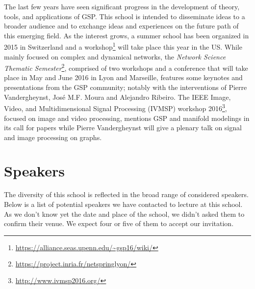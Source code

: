 \documentclass[a4paper]{scrartcl}
\begin{document}
The last few years have seen significant progress in the development of theory,
tools, and applications of GSP. This school is intended to disseminate ideas to
a broader audience and to exchange ideas and experiences on the future path of
this emerging field.
As the interest grows, a summer school has been organized in 2015 in Switzerland
and a workshop\footnote{\url{https://alliance.seas.upenn.edu/~gsp16/wiki/}} will
take place this year in the US.
While mainly focused on complex and dynamical networks, the \textit{Network
Science Thematic Semester}\footnote{
\url{https://project.inria.fr/netspringlyon/}}, comprised of two workshops and a
conference that will take place in May and June 2016 in Lyon and Marseille,
features some keynotes and presentations from the GSP community; notably with
the interventions of Pierre Vandergheynst, José M.F. Moura and Alejandro
Ribeiro.
The IEEE Image, Video, and Multidimensional Signal Processing (IVMSP) workshop
2016\footnote{ \url{http://www.ivmsp2016.org/}}, focused on image and video
processing, mentions GSP and manifold modelings in its call for papers while
Pierre Vandergheynst will give a plenary talk on signal and image processing on
graphs.

\section{Speakers}

The diversity of this school is reflected in the broad range of considered
speakers. Below is a list of potential speakers we have contacted to lecture at
this school. As we don't know yet the date and place of the school, we didn't
asked them to confirm their venue. We expect four or five of them to accept our
invitation.
\end{document}
